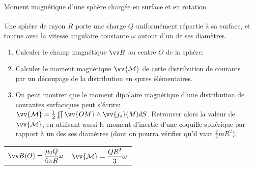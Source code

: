 \documentclass[french, a4paper, 11pt]{article}
\begin{document}
\begin{cadre}{Moment magnétique d'une sphère chargée en surface et en rotation}
  \paragraph*{}
  Une sphère de rayon $R$ porte une charge $Q$ uniformément répartie à sa surface, et tourne avec la vitesse angulaire constante $\omega$ autour d'un de ses diamètres.
  \begin{enumerate}[label=\upshape\alph*)]
    \item Calculer le champ magnétique $\vv B$ au centre $O$ de la sphère.
    \item Calculer le moment magnétique $\vv{\mathcal M}$ de cette distribution de courants par un découpage de la distribution en spires élémentaires.
    \item On peut montrer que le moment dipolaire magnétique d'une distribution de courantes surfaciques peut s'écrire: $\vv{\mathcal M} = \frac{1}{2}\iint\vv{OM}\wedge \vv{j_{s}}(M)dS$. Retrouver alors la valeur de $\vv{\mathcal M}$, en utilisant aussi le moment d'inertie d'une coquille sphérique par rapport à un des ses diamètres (dont on pourra vérifier qu'il vaut $\frac{2}{3}mR^{2}$).
  \end{enumerate}
  \tcblower
  \begin{tabularx}{\linewidth}{Xr}
    $\vv B(O) = \dfrac{\mu_{0}Q}{6\pi R}\omega$ & $\vv{\mathcal M} = \dfrac{QR^{2}}{3}\omega$
  \end{tabularx}
\end{cadre}
\end{document}
